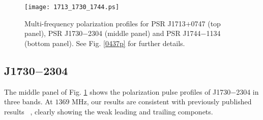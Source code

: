 \documentclass[useAMS,usenatbib]{mn2e}
\begin{document}

\begin{figure}
\begin{center}
\texttt{[image: 1713\_1730\_1744.ps]}
\caption{Multi-frequency polarization profiles for PSR J1713$+$0747 (top 
panel), PSR J1730$-$2304 (middle panel) and PSR J1744$-$1134 (bottom panel). 
See Fig. \ref{0437p} for further details.}
\label{1713p}
\end{center}
\end{figure}

\subsection{J1730$-$2304}

The middle panel of Fig. \ref{1713p} shows the polarization pulse profiles of J1730$-$2304 
in three bands.
%
At $1369$ MHz, our results are consistent with previously published results
~\citep{Ord04,Yan11}, clearly showing the weak leading and trailing componets.
%


%

\end{document}
